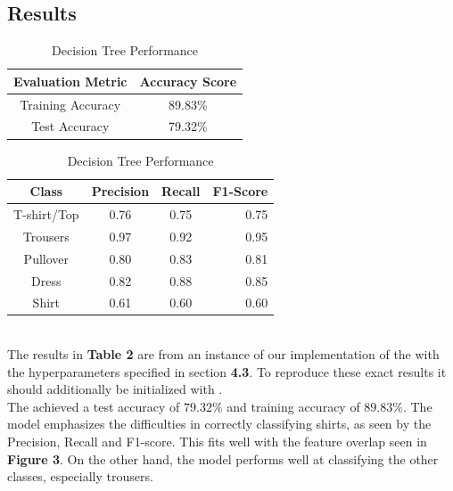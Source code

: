 \subsection{Results}\label{subsec:results}
\begin{table}[!ht]
\begin{subtable}[c]{0.4\textwidth}
\footnotesize
\centering
\begin{tabular}{ c | c }
 \toprule
 Evaluation Metric & Accuracy Score  \\
 \midrule
 Training Accuracy &  89.83\% \\
 Test Accuracy &79.32\% \\
 \bottomrule
\end{tabular}
\captionsetup{justification=centering,margin=1cm}
\end{subtable}
\begin{subtable}[c]{0.6\textwidth}
\footnotesize
\centering
\begin{tabular}{c | c c r}
Class & Precision & Recall & F1-Score\\
\midrule
T-shirt/Top   &    0.76  &    0.75  &    0.75 \\
Trousers   &    0.97  &    0.92  &    0.95 \\
Pullover   &    0.80  &    0.83  &    0.81\\
Dress   &    0.82  &    0.88  &    0.85\\
Shirt   &    0.61  &    0.60  &    0.60\\
\end{tabular}
\captionsetup{justification=centering,margin=1cm}
\end{subtable}
\caption{Decision Tree Performance}
\label{tab:dt_evaluation}
\end{table} \\

The results in \textbf{Table 2} are from an instance of our implementation of the  with the hyperparameters specified in section \textbf{4.3}.
To reproduce these exact results it should additionally be initialized with . \\

The  achieved a test accuracy of $79.32\%$ and training accuracy of $89.83\%$.
The model emphasizes the difficulties in correctly classifying shirts, as seen by the Precision, Recall and F1-score.
This fits well with the feature overlap seen in \textbf{Figure 3}.
On the other hand, the model performs well at classifying the other classes, especially trousers.








